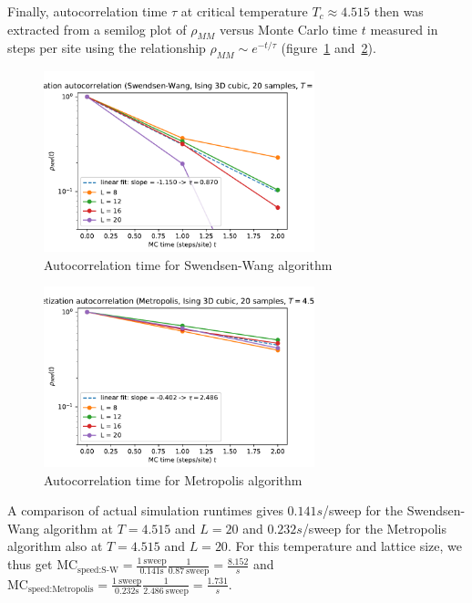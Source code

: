 \documentclass[11pt,a4paper]{article}
\begin{document}
Finally, autocorrelation time $\tau$ at critical temperature
$T_c \approx 4.515$ then was extracted from 
a semilog plot of $\rho_{MM}$ versus Monte Carlo time $t$ measured in steps per site using
the relationship $\rho_{MM} \sim e^{-t/\tau}$ (figure~\ref{fig:5} and~\ref{fig:6}).

\begin{figure}[b]
	\centering
	\includegraphics[width=0.7\textwidth]{tau_Swendsen_Wang.pdf}
	\caption[short]{Autocorrelation time for Swendsen-Wang algorithm}
	\label{fig:5}
\end{figure}

\begin{figure}[b]
	\centering
	\includegraphics[width=0.7\textwidth]{tau_Metropolis.pdf}
	\caption[short]{Autocorrelation time for Metropolis algorithm}
	\label{fig:6}
\end{figure}


A comparison of actual simulation runtimes gives $0.141s$/sweep for the Swendsen-Wang algorithm
at $T=4.515$ and $L=20$ and $0.232s$/sweep for the Metropolis algorithm also at $T=4.515$ and $L=20$.
For this temperature and lattice size, we thus get $\text{MC}_{\text{speed:S-W}} = \frac{1\ \text{sweep}}{0.141 \text{s}}\frac{1}{0.87\ \text{sweep}}= \frac{8.152}{s}$
and $\text{MC}_{\text{speed:Metropolis}} = \frac{1\ \text{sweep}}{0.232 \text{s}}\frac{1}{2.486\ \text{sweep}}= \frac{1.731}{s}$.
\end{document}
